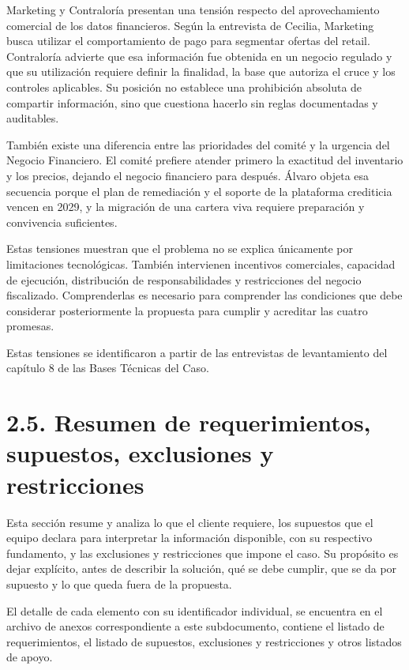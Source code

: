 \documentclass[11pt]{article}
\begin{document}
Marketing y Contraloría presentan una tensión respecto del aprovechamiento comercial de los datos financieros. Según la entrevista de Cecilia, Marketing busca utilizar el comportamiento de pago para segmentar ofertas del retail. Contraloría advierte que esa información fue obtenida en un negocio regulado y que su utilización requiere definir la finalidad, la base que autoriza el cruce y los controles aplicables. Su posición no establece una prohibición absoluta de compartir información, sino que cuestiona hacerlo sin reglas documentadas y auditables.

También existe una diferencia entre las prioridades del comité y la urgencia del Negocio Financiero. El comité prefiere atender primero la exactitud del inventario y los precios, dejando el negocio financiero para después. Álvaro objeta esa secuencia porque el plan de remediación y el soporte de la plataforma crediticia vencen en 2029, y la migración de una cartera viva requiere preparación y convivencia suficientes.

Estas tensiones muestran que el problema no se explica únicamente por limitaciones tecnológicas. También intervienen incentivos comerciales, capacidad de ejecución, distribución de responsabilidades y restricciones del negocio fiscalizado. Comprenderlas es necesario para comprender las condiciones que debe considerar posteriormente la propuesta para cumplir y acreditar las cuatro promesas.

Estas tensiones se identificaron a partir de las entrevistas de levantamiento del capítulo 8 de las Bases Técnicas del Caso.

\section{2.5. Resumen de requerimientos, supuestos, exclusiones y restricciones}\label{resumen-de-requerimientos-supuestos-exclusiones-y-restricciones}

Esta sección resume y analiza lo que el cliente requiere, los supuestos que el equipo declara para interpretar la información disponible, con su respectivo fundamento, y las exclusiones y restricciones que impone el caso. Su propósito es dejar explícito, antes de describir la solución, qué se debe cumplir, que se da por supuesto y lo que queda fuera de la propuesta.

El detalle de cada elemento con su identificador individual, se encuentra en el archivo de anexos correspondiente a este subdocumento, contiene el listado de requerimientos, el listado de supuestos, exclusiones y restricciones y otros listados de apoyo.
\end{document}
